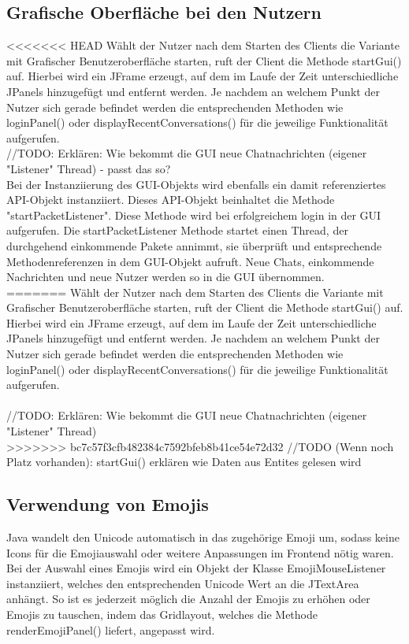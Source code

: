 
\author{Jan Grübener, Patrick Mischka}
\subsection{Grafische Oberfläche bei den Nutzern}
<<<<<<< HEAD
Wählt der Nutzer nach dem Starten des Clients die Variante mit Grafischer Benutzeroberfläche starten, ruft der Client die Methode startGui() auf. Hierbei wird ein JFrame erzeugt, auf dem im Laufe der Zeit unterschiedliche JPanels hinzugefügt und entfernt werden. Je nachdem an welchem Punkt der Nutzer sich gerade befindet werden die entsprechenden Methoden wie loginPanel() oder displayRecentConversations() für die jeweilige Funktionalität aufgerufen. \\

//TODO: Erklären: Wie bekommt die GUI neue Chatnachrichten (eigener "Listener" Thread) - passt das so? \\
Bei der Instanziierung des GUI-Objekts wird ebenfalls ein damit referenziertes 
API-Objekt instanziiert. Dieses API-Objekt beinhaltet die Methode 
"startPacketListener". Diese Methode wird bei erfolgreichem login in der GUI 
aufgerufen. Die startPacketListener Methode startet einen Thread, der durchgehend 
einkommende Pakete annimmt, sie überprüft und entsprechende Methodenreferenzen in dem 
GUI-Objekt aufruft. Neue Chats, einkommende Nachrichten und neue Nutzer werden so 
in die GUI übernommen.\\

=======
Wählt der Nutzer nach dem Starten des Clients die Variante mit Grafischer Benutzeroberfläche starten, ruft der Client die Methode startGui() auf. Hierbei wird ein JFrame erzeugt, auf dem im Laufe der Zeit unterschiedliche JPanels hinzugefügt und entfernt werden. Je nachdem an welchem Punkt der Nutzer sich gerade befindet werden die entsprechenden Methoden wie loginPanel() oder displayRecentConversations() für die jeweilige Funktionalität aufgerufen. \\ \\
//TODO: Erklären: Wie bekommt die GUI neue Chatnachrichten (eigener "Listener" Thread) \\
>>>>>>> bc7c57f3cfb482384c7592bfeb8b41ce54e72d32
//TODO (Wenn noch Platz vorhanden): startGui() erklären wie Daten aus Entites gelesen wird
\author{Jan Grübener, Patrick Mischka}
\subsection{Verwendung von Emojis}
Java wandelt den Unicode automatisch in das zugehörige Emoji um, sodass keine Icons für die Emojiauswahl oder weitere Anpassungen im Frontend nötig waren. Bei der Auswahl eines Emojis wird ein Objekt der Klasse EmojiMouseListener instanziiert, welches den entsprechenden Unicode Wert an die JTextArea anhängt. So ist es jederzeit möglich die Anzahl der Emojis zu erhöhen oder Emojis zu tauschen, indem das Gridlayout, welches die Methode renderEmojiPanel() liefert, angepasst wird.

